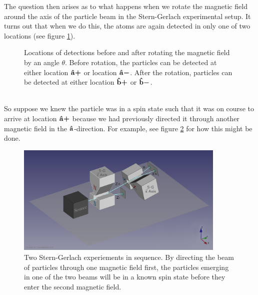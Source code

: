 The question then arises as to what happens when we rotate the magnetic field around the axis of the particle beam in the Stern-Gerlach experimental setup. It turns out that when we do this, the atoms are again detected in only one of two locations (see figure \ref{rotate}).
\begin{figure}[ht!]
\captionsetup{justification=justified}
\centering
\usetikzlibrary {angles, quotes, calc} 
\vspace*{10px}
\caption{Locations of detections before and after rotating the magnetic field by an angle $\theta$. Before rotation, the particles can be detected at either location $\vb{\hat{{a}}}\bm{+}$ or location $\vb{\hat{{a}}}\bm{-}$. After the rotation, particles can be detected at either location $\vb{\hat{{b}}}\bm{+}$ or $\vb{\hat{{b}}}\bm{-}$. }
\label{rotate}
\end{figure}
\\ \noindent
So suppose we knew the particle was in a spin state such that it was on course to arrive at location $\vb{\hat{{a}}}\bm{+}$ because we had previously directed it through another magnetic field in the $\vb{\hat{{a}}}$-direction. For example, see figure \ref{knownspin} for how this might be done.
\begin{figure}[ht!]
\captionsetup{justification=centering}
\centering
\includegraphics[width=100mm]{Chapter01/1920px-Stern-Gerlach_Analyzer_Sequential_Series_E2v.png}
\vspace*{10px}
\caption{Two Stern-Gerlach experiements in sequence. By directing the beam of particles through one magnetic field first, the particles emerging in one of the two beams will be in a known spin state before they enter the second magnetic field.\protect\footnotemark}
\label{knownspin}
\end{figure}
